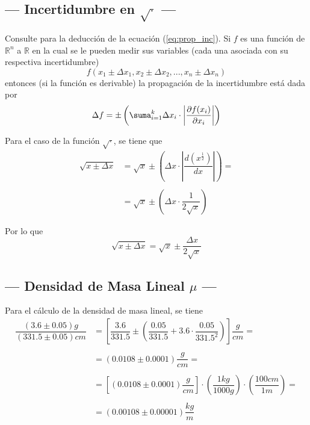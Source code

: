 \documentclass[10pt,a4paper]{article}
\begin{document}
	\subsection{--- Incertidumbre en $ \sqrt{\cdot} $ ---}
	
	Consulte  para la deducción de la ecuación (\ref{eq:prop_inc}). Si $f$ es una función de $\mathds{R}^n$ a $\mathds{R}$ en la cual se le pueden medir sus variables (cada una asociada con su respectiva incertidumbre)
	$$f(x_1\pm\Delta x_1,x_2\pm\Delta x_2,...,x_n\pm\Delta x_n)$$
	entonces (si la función es derivable) la propagación de la incertidumbre está dada por
	\begin{equation}
		\Delta f=\pm\left(\displaystyle\suma_{i=1}^k\Delta x_i\cdot\left|\dfrac{\partial f(x_i)}{\partial x_i}\right| \right)
		\label{eq:prop_inc}
	\end{equation} 
	
	Para el caso de la función $ \sqrt{\cdot} $, se tiene que 
	\begin{align*}
		\sqrt{x\pm\Delta x}&=
		\sqrt{x}\pm\left(\Delta x\cdot\left|\dfrac{d(x^{\frac{1}{2}})}{dx}\right|\right)=\\\\
		&=\sqrt{x}\pm\left(\Delta x\cdot\dfrac{1}{2\sqrt{x}}\right)
	\end{align*} 
	
	Por lo que
	\begin{equation}
		\sqrt{x\pm\Delta x}=\sqrt{x}\pm\dfrac{\Delta x}{2\sqrt{x}}
		\label{rc}
	\end{equation}
	
	\subsection{--- Densidad de Masa Lineal $ \mu $ ---}
	\label{sub:densidad}
	
	Para el cálculo de la densidad de masa lineal, se tiene
	\begin{align*}
		\dfrac{(3.6 \pm 0.05)g}{(331.5\pm 0.05) cm }&=\left[\dfrac{3.6}{331.5}\pm \left(\dfrac{0.05}{331.5}+3.6\cdot \dfrac{0.05}{331.5^2}\right)\right]\dfrac{g}{cm}=\\\\
		&=\left(0.0108\pm0.0001\right)\dfrac{g}{cm}=\\\\
		&=\left[\left(0.0108\pm0.0001\right)\dfrac{g}{cm}\right]\cdot
		\left(\dfrac{1kg}{1000 g}\right)\cdot\left(\dfrac{100 cm}{1 m}\right)=\\\\
		&=(0.00108\pm 0.00001)\dfrac{kg}{m}
	\end{align*}
	
\end{document}
